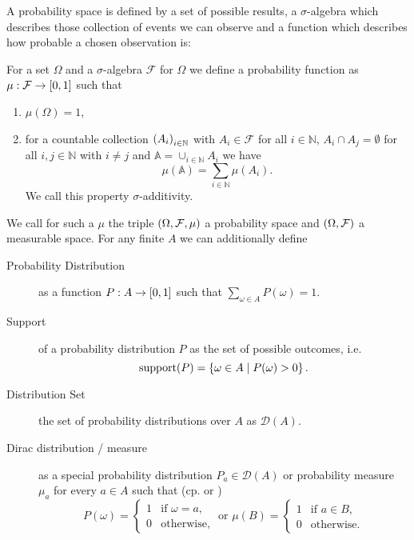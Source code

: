 A probability space is defined by a set of possible results, a $\sigma$-algebra
which describes those collection of events we can observe and a function which
describes how probable a chosen observation is:
\begin{definition}
  For a set $\Omega$ and a $\sigma$-algebra $\mathcal{F}$ for $\Omega$ we
  define a probability function as $\mu:\mathcal{F}\rightarrow\left[0,1\right]$
  such that
  \begin{enumerate}
    \item $\mu(\Omega) = 1$,
    \item for a countable collection $\left(A_{i}\right)_{i\in\mathbb{N}}$ with
      $A_{i}\in\mathcal{F}$ for all $i\in\mathbb{N}$,
      $A_{i}\cap A_{j} = \emptyset$ for all $i, j\in\mathbb{N}$ with $i\neq j$
      and $\mathbb{A} = \cup_{i\in\mathbb{N}}A_{i}$ we have
      \begin{equation*}
        \mu(\mathbb{A}) = \sum_{i\in\mathbb{N}}\mu(A_{i}).
      \end{equation*}
      We call this property $\sigma$-additivity.
  \end{enumerate}
  We call for such a $\mu$ the triple $\left(\Omega,\mathcal{F},\mu\right)$ a 
  probability space and $\left(\Omega, \mathcal{F}\right)$ a measurable space. For
  any finite $A$ we can additionally define
  \begin{description}
    \item [Probability Distribution] as a function
      $P:A\rightarrow\left[0,1\right]$ such that
      $\sum_{\omega\in A}P(\omega) = 1$.
    \item [Support] of a probability distribution $P$ as the set of possible
      outcomes, i.e.
      \begin{equation*}
        \operatorname{support}(P) = \left\{\omega\in A\mid P(\omega) > 0\right\}.
      \end{equation*}
    \item [Distribution Set] the set of probability distributions over $A$ as
      $\mathcal{D}(A)$.
    \item [Dirac distribution / measure] as a special probability distribution 
      $P_{a}\in\mathcal{D}(A)$ or probability measure $\mu_{a}$ for every 
      $a\in A$ such that (cp. \cite[Example 1.30]{Klenke} or \cite{POSG})
      \begin{equation*}
        P(\omega) = \begin{cases}
          1&\text{if }\omega = a,\\
          0&\text{otherwise},
        \end{cases}
        \text{ or }
        \mu(B) = \begin{cases}
          1&\text{if }a\in B,\\
          0&\text{otherwise}.
        \end{cases}
      \end{equation*}
  \end{description}
\end{definition}
